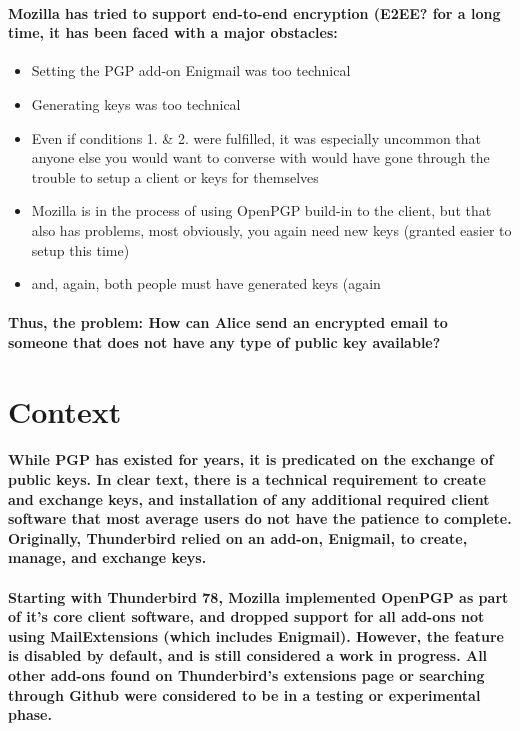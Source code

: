 \paragraph{Mozilla has tried to support end-to-end encryption (E2EE? for a long time, it has been faced with a major obstacles:}

\begin{itemize}
\item Setting the PGP add-on Enigmail was too technical
\item Generating keys was too technical
\item Even if conditions 1. \& 2. were fulfilled, it was especially uncommon that anyone else you would want to converse with would have gone through the trouble to setup a client or keys for themselves
\item Mozilla is in the process of using OpenPGP build-in to the client, but that also has problems, most obviously, you again need new keys (granted easier to setup this time)
\item and, again, both people must have generated keys (again
\end{itemize}

\paragraph{Thus, the problem: How can Alice send an encrypted email to someone that does not have any type of public key available?}


\section{Context}
\paragraph{While PGP has existed for years, it is predicated on the exchange of public keys. In clear text, there is a technical requirement to create and exchange keys, and installation of any additional required client software that most average users do not have the patience to complete. Originally, Thunderbird relied on an add-on, Enigmail, to create, manage, and exchange keys.}

\paragraph{Starting with Thunderbird 78, Mozilla implemented OpenPGP as part of it's core client software, and dropped support for all add-ons not using MailExtensions (which includes Enigmail). However, the feature is disabled by default, and is still considered a work in progress. All other add-ons found on Thunderbird's extensions page or searching through Github were considered to be in a testing or experimental phase.}

